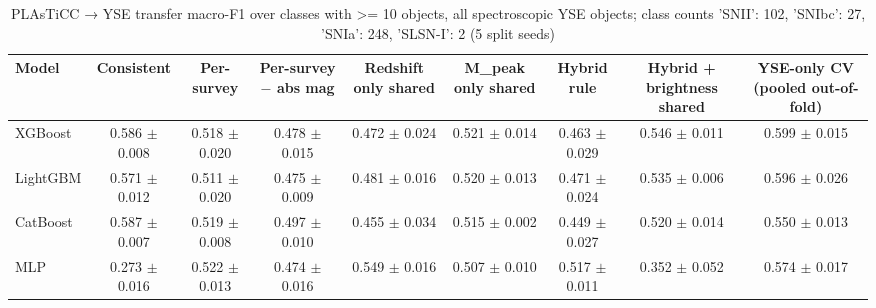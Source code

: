 \begin{table}
\centering
\caption{PLAsTiCC → YSE transfer macro-F1 over classes with >= 10 objects, all spectroscopic YSE objects; class counts {'SNII': 102, 'SNIbc': 27, 'SNIa': 248, 'SLSN-I': 2} (5 split seeds)}
\begin{tabular}{lcccccccc}
\hline
Model & Consistent & Per-survey & Per-survey $-$ abs mag & Redshift only shared & M\_peak only shared & Hybrid rule & Hybrid + brightness shared & YSE-only CV (pooled out-of-fold) \\
\hline
XGBoost & 0.586 $\pm$ 0.008 & 0.518 $\pm$ 0.020 & 0.478 $\pm$ 0.015 & 0.472 $\pm$ 0.024 & 0.521 $\pm$ 0.014 & 0.463 $\pm$ 0.029 & 0.546 $\pm$ 0.011 & 0.599 $\pm$ 0.015 \\
LightGBM & 0.571 $\pm$ 0.012 & 0.511 $\pm$ 0.020 & 0.475 $\pm$ 0.009 & 0.481 $\pm$ 0.016 & 0.520 $\pm$ 0.013 & 0.471 $\pm$ 0.024 & 0.535 $\pm$ 0.006 & 0.596 $\pm$ 0.026 \\
CatBoost & 0.587 $\pm$ 0.007 & 0.519 $\pm$ 0.008 & 0.497 $\pm$ 0.010 & 0.455 $\pm$ 0.034 & 0.515 $\pm$ 0.002 & 0.449 $\pm$ 0.027 & 0.520 $\pm$ 0.014 & 0.550 $\pm$ 0.013 \\
MLP & 0.273 $\pm$ 0.016 & 0.522 $\pm$ 0.013 & 0.474 $\pm$ 0.016 & 0.549 $\pm$ 0.016 & 0.507 $\pm$ 0.010 & 0.517 $\pm$ 0.011 & 0.352 $\pm$ 0.052 & 0.574 $\pm$ 0.017 \\
\hline
\end{tabular}
\end{table}
